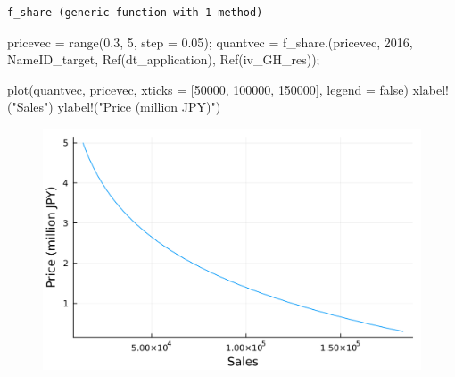 \documentclass[
  letterpaper,
  DIV=11,
  numbers=noendperiod]{scrreprt}
\newenvironment{Shaded}{\begin{snugshade}}{\end{snugshade}}
\newcommand{\ConstantTok}[1]{\textcolor[rgb]{0.56,0.35,0.01}{#1}}
\newcommand{\FloatTok}[1]{\textcolor[rgb]{0.68,0.00,0.00}{#1}}
\newcommand{\FunctionTok}[1]{\textcolor[rgb]{0.28,0.35,0.67}{#1}}
\newcommand{\NormalTok}[1]{\textcolor[rgb]{0.00,0.23,0.31}{#1}}
\newcommand{\OperatorTok}[1]{\textcolor[rgb]{0.37,0.37,0.37}{#1}}
\newcommand{\StringTok}[1]{\textcolor[rgb]{0.13,0.47,0.30}{#1}}
\begin{document}
\begin{verbatim}
f_share (generic function with 1 method)
\end{verbatim}

\begin{Shaded}
\begin{Highlighting}[]
\NormalTok{pricevec }\OperatorTok{=} \FunctionTok{range}\NormalTok{(}\FloatTok{0.3}\NormalTok{, }\FloatTok{5}\NormalTok{, step }\OperatorTok{=} \FloatTok{0.05}\NormalTok{);}
\NormalTok{quantvec }\OperatorTok{=} \FunctionTok{f\_share}\NormalTok{.(pricevec, }\FloatTok{2016}\NormalTok{, NameID\_target, }\FunctionTok{Ref}\NormalTok{(dt\_application), }\FunctionTok{Ref}\NormalTok{(iv\_GH\_res));}
\end{Highlighting}
\end{Shaded}

\begin{Shaded}
\begin{Highlighting}[]
\FunctionTok{plot}\NormalTok{(quantvec, pricevec, xticks }\OperatorTok{=}\NormalTok{ [}\FloatTok{50000}\NormalTok{, }\FloatTok{100000}\NormalTok{, }\FloatTok{150000}\NormalTok{], legend }\OperatorTok{=} \ConstantTok{false}\NormalTok{)}
\FunctionTok{xlabel!}\NormalTok{(}\StringTok{"Sales"}\NormalTok{)}
\FunctionTok{ylabel!}\NormalTok{(}\StringTok{"Price (million JPY)"}\NormalTok{)}
\end{Highlighting}
\end{Shaded}

\begin{figure}[H]

{\centering \includegraphics{./demand_estimation_1_files/figure-pdf/cell-29-output-1.svg}

}

\end{figure}
\end{document}
